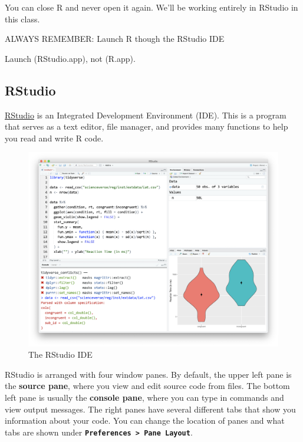 \documentclass[
  oneside]{book}
\begin{document}
You can close R and never open it again. We'll be working entirely in RStudio in this class.

\begin{warning}
ALWAYS REMEMBER: Launch R though the RStudio IDE

Launch (RStudio.app), not (R.app).

\end{warning}

\hypertarget{rstudio_ide}{%
\subsection{RStudio}\label{rstudio_ide}}

\href{http://www.rstudio.com}{RStudio} is an Integrated Development Environment (IDE). This is a program that serves as a text editor, file manager, and provides many functions to help you read and write R code.

\begin{figure}

{\centering \includegraphics[width=1\linewidth]{images/intro/rstudio} 

}

\caption{The RStudio IDE}\label{fig:img-rstudio}
\end{figure}

RStudio is arranged with four window panes. By default, the upper left pane is the \textbf{source pane}, where you view and edit source code from files. The bottom left pane is usually the \textbf{console pane}, where you can type in commands and view output messages. The right panes have several different tabs that show you information about your code. You can change the location of panes and what tabs are shown under \textbf{\texttt{Preferences\ \textgreater{}\ Pane\ Layout}}.
\end{document}
